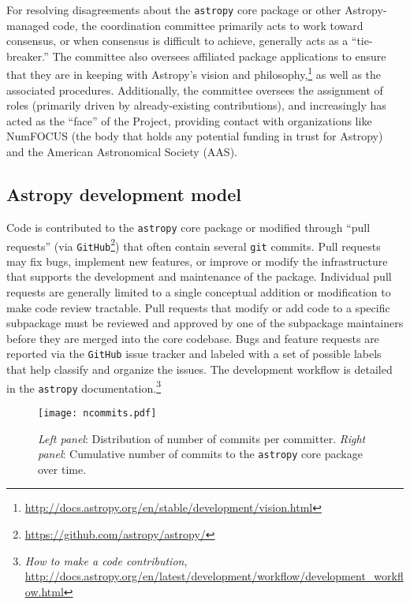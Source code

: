 \documentclass[modern]{aastex62}
\newcommand{\package}[1]{\texttt{#1}\xspace}
\newcommand{\github}{\package{GitHub}}
\newcommand{\astropy}{Astropy\xspace}
\newcommand{\astropypkg}{\package{astropy}}
\begin{document}
For resolving disagreements about the \astropypkg core package or other \astropy-managed code, the coordination committee primarily acts to work toward consensus, or when consensus is difficult to achieve, generally acts as a ``tie-breaker.''
The committee also oversees affiliated package applications to ensure that they
are in keeping with \astropy's vision and
philosophy,\footnote{\url{http://docs.astropy.org/en/stable/development/vision.html}}
as well as the associated procedures.
Additionally, the committee oversees the assignment of roles (primarily driven by already-existing contributions), and increasingly has acted as the ``face'' of the Project, providing contact with organizations like NumFOCUS (the body that holds any potential funding in trust for \astropy) and the American Astronomical Society (AAS).

\subsection{Astropy development model}
\label{sect:devmod}
Code is contributed to the \astropypkg core package or modified through ``pull
requests'' (via \github\footnote{\url{https://github.com/astropy/astropy/}})
that often contain several \texttt{git} commits.
Pull requests may fix bugs, implement new features, or improve or modify the
infrastructure that supports the development and maintenance of the package.
Individual pull requests are generally limited to a single conceptual addition
or modification to make code review tractable.
Pull requests that modify or add code to a specific subpackage must be reviewed
and approved by one of the subpackage maintainers before they are merged into
the core codebase.
Bugs and feature requests are reported via the \github issue tracker and labeled
with a set of possible labels that help classify and organize the issues.
The development workflow is detailed in the \astropypkg
documentation.\footnote{\emph{How to make a code contribution},
\url{http://docs.astropy.org/en/latest/development/workflow/development_workflow.html}}

\begin{figure}
\texttt{[image: ncommits.pdf]}
\caption{%
    \emph{Left panel}: Distribution of number of commits per committer.
    \emph{Right panel}: Cumulative number of commits to the \astropypkg core
    package over time.
    \label{fig:ncommits}
}
\end{figure}
\end{document}
